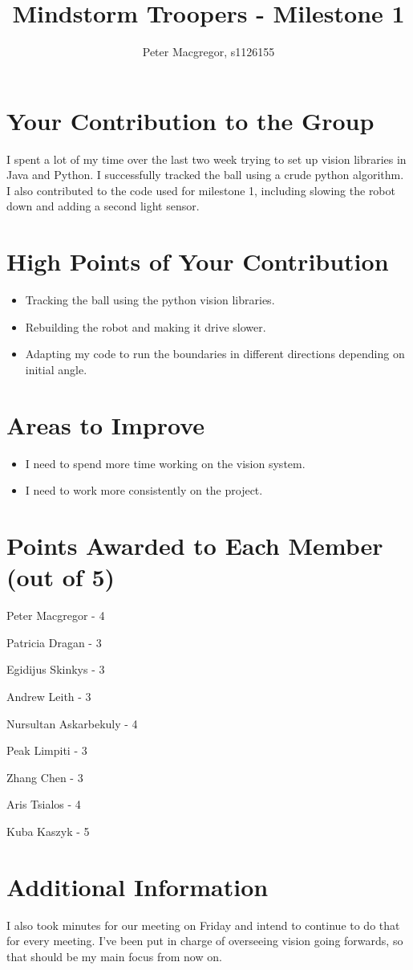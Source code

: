 \documentclass[dvips]{article}
\begin{document}
\sloppy
\title{Mindstorm Troopers - Milestone 1}
 
\author{Peter Macgregor, s1126155}
 
\maketitle

\section{Your Contribution to the Group}
I spent a lot of my time over the last two week trying to set up vision libraries
in Java and Python. I successfully tracked the ball using a crude python algorithm.
I also contributed to the code used for milestone 1, including slowing the robot down
and adding a second light sensor.

\section{High Points of Your Contribution}
\begin{itemize}
  \item Tracking the ball using the python vision libraries.
  \item Rebuilding the robot and making it drive slower.
  \item Adapting my code to run the boundaries in different directions depending on initial angle.
\end{itemize} 

\section{Areas to Improve}
\begin{itemize}
  \item I need to spend more time working on the vision system.
  \item I need to work more consistently on the project.
\end{itemize}


\section{Points Awarded to Each Member (out of 5)}
\begin{itemize}
\begin{multicols}{2}
\item Peter Macgregor - 4
\item Patricia Dragan - 3
\item Egidijus Skinkys - 3
\item Andrew Leith - 3
\item Nursultan Askarbekuly - 4
\item Peak Limpiti - 3
\item Zhang Chen - 3
\item Aris Tsialos - 4
\item Kuba Kaszyk - 5
\end{multicols}
\end{itemize}

\section{Additional Information}
I also took minutes for our meeting on Friday and intend to continue to do that for every
meeting. I've been put in charge of overseeing vision going forwards, so that should be
my main focus from now on.
\end{document}
